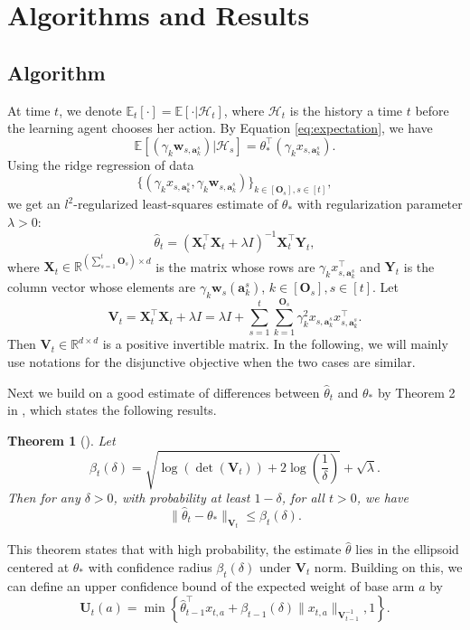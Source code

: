 \documentclass{article}
\newcommand{\EE}{\mathbb{E}}
\newcommand{\RR}{\mathbb{R}}
\newcommand{\ba}{\mathbf{a}}
\newcommand{\bO}{\mathbf{O}}
\newcommand{\bU}{\mathbf{U}}
\newcommand{\bV}{\mathbf{V}}
\newcommand{\bw}{\mathbf{w}}
\newcommand{\bX}{\mathbf{X}}
\newcommand{\bY}{\mathbf{Y}}
\newcommand{\cH}{\mathcal{H}}
\newcommand{\norm}[1]{\| #1 \|}
\newtheorem{theorem}{Theorem}[section]
\begin{document}
\section{Algorithms and Results}

\subsection{Algorithm}
	
At time $t$, we denote $\EE_t[\cdot] = \EE[\cdot | \cH_t]$, where $\cH_t$ is the history a time $t$ before the learning agent
	chooses her action. 
By Equation \eqref{eq:expectation}, we have 
$$
\EE[(\gamma_k \bw_{s,\ba_k^s}) | \cH_{s}] = \theta_*^{\top} (\gamma_k x_{s,\ba_k^s}).
$$
Using the ridge regression of data 
$$
\{(\gamma_k x_{s,\ba_k^s}, \gamma_k \bw_{s,\ba_k^s})\}_{k \in[\bO_s], s\in[t]},
$$
we get an $l^2$-regularized least-squares estimate of $\theta_*$ with regularization parameter $\lambda > 0$:
\begin{equation}
\hat{\theta}_t = (\bX_t^{\top}\bX_t + \lambda I)^{-1} \bX_t^{\top} \bY_t,
\end{equation}
where $\bX_t \in \RR^{(\sum_{s=1}^{t}\bO_s) \times d}$ is the matrix whose rows are $\gamma_k x_{s,\ba_k^s}^{\top}$ and $\bY_t$ is the column vector whose elements are $\gamma_k \bw_s(\ba_k^s)$, $k \in[\bO_s], s\in[t]$. Let
$$
\bV_t = \bX_t^{\top} \bX_t + \lambda I = \lambda I + \sum_{s=1}^{t} \sum_{k=1}^{\bO_s} \gamma_k^2 x_{s,\ba_k^s}x_{s,\ba_k^s}^{\top}.
$$
Then $\bV_t \in \RR^{d \times d}$ is a positive invertible matrix. 
In the following, we will mainly use notations for the disjunctive objective when the two cases are similar.

Next we build on a good estimate of differences between $\hat{\theta}_t$ and $\theta_*$ by Theorem 2 in \cite{abbasi2011improved}, which states the following results.
	
\begin{theorem}[\cite{abbasi2011improved}]
\label{thm:theta_estimate}
Let 
$$
\beta_{t}(\delta) = \sqrt{\log(\det(\bV_{t})) + 2 \log\left(\frac{1}{\delta}\right)} + \sqrt{\lambda}.
$$
Then for any $\delta > 0$, with probability at least $1 - \delta$, for all $t > 0$, we have
\begin{equation}
\label{eq:estimateTheta}
\norm{\hat{\theta}_t - \theta_{\ast}}_{\bV_{t}} \leq \beta_{t}(\delta).
\end{equation}
\end{theorem}

This theorem states that with high probability, the estimate $\hat{\theta}$ lies in the ellipsoid centered at $\theta_*$  with confidence radius $\beta_t(\delta)$ under $\bV_t$ norm. Building on this, we can define an upper confidence bound of the expected weight of base arm $a$ by
\begin{equation}
\label{eq:defU}
\bU_t(a) = \min\left\{\hat{\theta}_{t-1}^{\top}x_{t,a} + \beta_{t-1}(\delta)\norm{x_{t,a}}_{\bV_{t-1}^{-1}}, 1 \right\}.
\end{equation}
\end{document}
